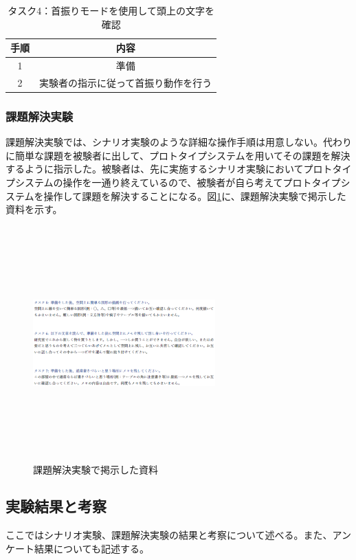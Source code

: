 \documentclass[11pt,a4j, titlepage]{jarticle} %
\begin{document}
\begin{table}[H]
\caption{タスク4：首振りモードを使用して頭上の文字を確認}
\label{table:task4}
\begin{center}
\begin{tabular}{|c|c|}
\hline
手順 & 内容  \\
\hline\hline
1 & 準備  \\
\hline
2 & 実験者の指示に従って首振り動作を行う  \\
\hline
\end{tabular}
\end{center}
\end{table}

\subsubsection{課題解決実験}
課題解決実験では、シナリオ実験のような詳細な操作手順は用意しない。代わりに簡単な課題を被験者に出して、プロトタイプシステムを用いてその課題を解決するように指示した。被験者は、先に実施するシナリオ実験においてプロトタイプシステムの操作を一通り終えているので、被験者が自ら考えてプロトタイプシステムを操作して課題を解決することになる。図\ref{fig:task5}に、課題解決実験で掲示した資料を示す。

\begin{figure}[H]
  \begin{center}
    \includegraphics[clip,height=9.0cm,width=7.0cm]{./task5.eps}
    \caption{課題解決実験で掲示した資料}
    \label{fig:task5}
  \end{center}
\end{figure}

\subsection{実験結果と考察}
ここではシナリオ実験、課題解決実験の結果と考察について述べる。また、アンケート結果についても記述する。
\end{document}
